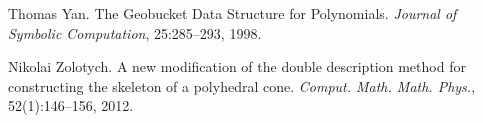 \begin{DoxyDescription}
\item[\label{_CITEREF_YanGeobuckets}%
\mbox{[}10\mbox{]}]Thomas Yan. The Geobucket Data Structure for Polynomials. {\itshape Journal of Symbolic Computation}, 25\+:285--293, 1998.


\item[\label{_CITEREF_Zolotych_DoubleDescription}%
\mbox{[}11\mbox{]}]Nikolai Zolotych. A new modification of the double description method for constructing the skeleton of a polyhedral cone. {\itshape Comput. Math. Math. Phys.}, 52(1)\+:146--156, 2012.


\end{DoxyDescription}